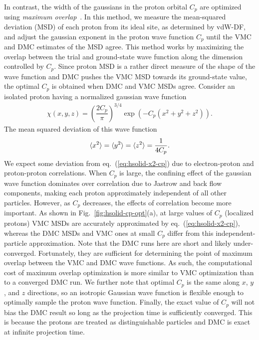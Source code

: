 In contrast, the width of the gaussians in the proton orbital $C_p$ are optimized using \emph{maximum overlap}~\cite{Reatto1982,Natoli1993,Natoli1995}.
In this method, we measure the mean-squared deviation (MSD) of each proton from its ideal site, as determined by vdW-DF, and adjust the gaussian exponent in the proton wave function $C_p$ until the VMC and DMC estimates of the MSD agree.
This method works by maximizing the overlap between the trial and ground-state wave function along the dimension controlled by $C_p$.
Since proton MSD is a rather direct measure of the shape of the wave function and DMC pushes the VMC MSD towards its ground-state value, the optimal $C_p$ is obtained when DMC and VMC MSDs agree.
Consider an isolated proton having a normalized gaussian wave function
\begin{align}
\chi(x, y, z) = \left(\dfrac{2C_p}{\pi}\right)^{3/4} \exp\left(
-C_p(x^2+y^2+z^2)
\right).
\end{align}
The mean squared deviation of this wave function
\begin{align} \label{eq:hsolid-x2-cp}
\braket{x^2}=\braket{y^2}=\braket{z^2}=\dfrac{1}{4C_p}.
\end{align}
We expect some deviation from eq.~(\ref{eq:hsolid-x2-cp}) due to electron-proton and proton-proton correlations. When $C_p$ is large, the confining effect of the gaussian wave function dominates over correlation due to Jastrow and back flow components, making each proton approximately independent of all other particles.
However, as $C_p$ decreases, the effects of correlation become more important. As shown in Fig.~\ref{fig:hsolid-cp-opt}(a), at large values of $C_p$ (localized protons) VMC MSDs are accurately approximated by eq.~(\ref{eq:hsolid-x2-cp}), whereas the DMC MSDs and VMC ones at small $C_p$ differ from this independent-particle approximation.
Note that the DMC runs here are short and likely under-converged.
Fortunately, they are sufficient for determining the point of maximum overlap between the VMC and DMC wave functions.
As such, the computational cost of maximum overlap optimization is more similar to VMC optimization than to a converged DMC run.
We further note that optimal $C_p$ is the same along $x$, $y$, and $z$ directions, so an isotropic Gaussian wave function is flexible enough to optimally sample the proton wave function.
Finally, the exact value of $C_p$ will not bias the DMC result so long as the projection time is sufficiently converged. This is because the protons are treated as distinguishable particles and DMC is exact at infinite projection time.

